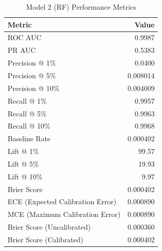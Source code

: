 \begin{table}[h]
\centering
\begin{tabular}{lr}
\toprule
Metric & Value \\
\midrule
ROC AUC & 0.9987 \\
PR AUC & 0.5383 \\
Precision @ 1\% & 0.0400 \\
Precision @ 5\% & 0.008014 \\
Precision @ 10\% & 0.004009 \\
Recall @ 1\% & 0.9957 \\
Recall @ 5\% & 0.9963 \\
Recall @ 10\% & 0.9968 \\
Baseline Rate & 0.000402 \\
Lift @ 1\% & 99.57 \\
Lift @ 5\% & 19.93 \\
Lift @ 10\% & 9.97 \\
Brier Score & 0.000402 \\
ECE (Expected Calibration Error) & 0.000890 \\
MCE (Maximum Calibration Error) & 0.000890 \\
Brier Score (Uncalibrated) & 0.000360 \\
Brier Score (Calibrated) & 0.000402 \\
\bottomrule
\end{tabular}
\caption{Model 2 (RF) Performance Metrics}
\label{tab:model2_rf_metrics}
\end{table}
